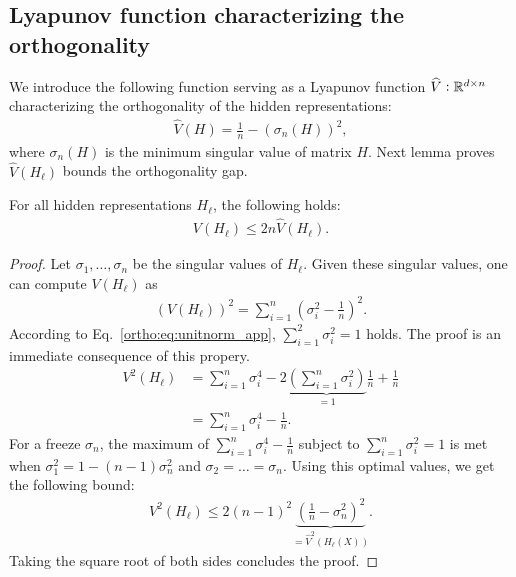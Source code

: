  \subsection*{Lyapunov function characterizing the orthogonality}
 We introduce the following function serving as a Lyapunov function $\widehat{V}:\mathbb{R}^{d\times n}$ characterizing the orthogonality of the hidden representations:
 \begin{align}
     \widehat{V}(H) = \frac{1}{n} - (\sigma_n (H))^2,
 \end{align}
 where $\sigma_n(H)$ is the minimum singular value of matrix $H$. Next lemma proves $\widehat{V}(H_\ell)$ bounds the orthogonality gap. 
 \begin{lemma} \label{ortho:lemma:Vbound}
 For all hidden representations $H_\ell$, the following holds:
 \begin{align}
     V(H_\ell) \leq 2 n \widehat{V}(H_\ell) \nonumber. 
 \end{align}
 \end{lemma}
 \begin{proof}
 Let $\sigma_1, \dots, \sigma_n$ be the singular values of $H_\ell$. Given these singular values, one can compute $V(H_\ell)$ as 
 \begin{align*}
     (V(H_\ell))^2 = \sum_{i=1}^n \left(\sigma_i^2-\frac{1}{n}\right)^2 \nonumber.
 \end{align*}
 According to Eq.~\eqref{ortho:eq:unitnorm_app}, $\sum_{i=1}^2 \sigma_i^2 = 1$ holds. The proof is an immediate consequence of this propery.   
 \begin{align} \nonumber
     V^2(H_\ell) &=  \sum_{i=1}^n \sigma_i^4 - 2 \underbrace{\left(\sum_{i=1}^n \sigma_i^2  \right)}_{=1}\frac{1}{n} + \frac{1}{n}\\ 
     & = \sum_{i=1}^n \sigma_i^4 -\frac{1}{n}. \nonumber
 \end{align}
 For a freeze $\sigma_n$, the maximum of $\sum_{i=1}^n \sigma_i^4 -\frac{1}{n}$ subject to $\sum_{i=1}^n \sigma_i^2 = 1$ is met when $\sigma_1^2 = 1-(n-1)\sigma_n^2$ and $\sigma_2 = \dots = \sigma_n$.
 Using this optimal values, we get the following bound:
 \begin{align} \nonumber
     V^2(H_\ell) \leq 2(n-1)^2 \underbrace{\left( \frac{1}{n} - \sigma_n^2\right)^2}_{=\widehat{V}^2(H_\ell(X))}.
 \end{align}
 Taking the square root of both sides concludes the proof.
 \end{proof}
 
 
 
